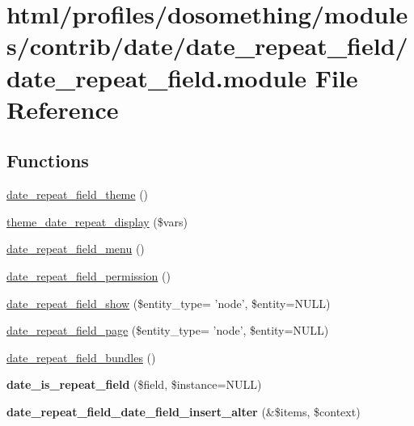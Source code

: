 \hypertarget{date__repeat__field_8module}{
\section{html/profiles/dosomething/modules/contrib/date/date\_\-repeat\_\-field/date\_\-repeat\_\-field.module File Reference}
\label{date__repeat__field_8module}
}
\subsection*{Functions}
\begin{DoxyCompactItemize}
\item 
\hyperlink{date__repeat__field_8module_a7c686d7c8b75e0b277263535a9b6fbce}{date\_\-repeat\_\-field\_\-theme} ()
\item 
\hyperlink{date__repeat__field_8module_aa7f03cf9bae57e4c06944720468a5d7b}{theme\_\-date\_\-repeat\_\-display} (\$vars)
\item 
\hyperlink{date__repeat__field_8module_a0b5b94e740d6fdd96411f1c230a1d465}{date\_\-repeat\_\-field\_\-menu} ()
\item 
\hyperlink{date__repeat__field_8module_ad4075999ffe895631c565c8ae295e742}{date\_\-repeat\_\-field\_\-permission} ()
\item 
\hyperlink{date__repeat__field_8module_adb20fc68338ed9fc0502c5b64dee6b69}{date\_\-repeat\_\-field\_\-show} (\$entity\_\-type= 'node', \$entity=NULL)
\item 
\hyperlink{date__repeat__field_8module_ac4e5602e2806df2d48d309694c20819c}{date\_\-repeat\_\-field\_\-page} (\$entity\_\-type= 'node', \$entity=NULL)
\item 
\hyperlink{date__repeat__field_8module_ac417a86109a016a6b5fea0f1fb9ab753}{date\_\-repeat\_\-field\_\-bundles} ()
\item 
\hypertarget{date__repeat__field_8module_af7c98a4d63cd82c5fe43d5d8cbebcb38}{
{\bfseries date\_\-is\_\-repeat\_\-field} (\$field, \$instance=NULL)}
\label{date__repeat__field_8module_af7c98a4d63cd82c5fe43d5d8cbebcb38}

\item 
\hypertarget{date__repeat__field_8module_a09114efb639bbf5b8283b5869113b158}{
{\bfseries date\_\-repeat\_\-field\_\-date\_\-field\_\-insert\_\-alter} (\&\$items, \$context)}
\label{date__repeat__field_8module_a09114efb639bbf5b8283b5869113b158}


\end{DoxyCompactItemize}
